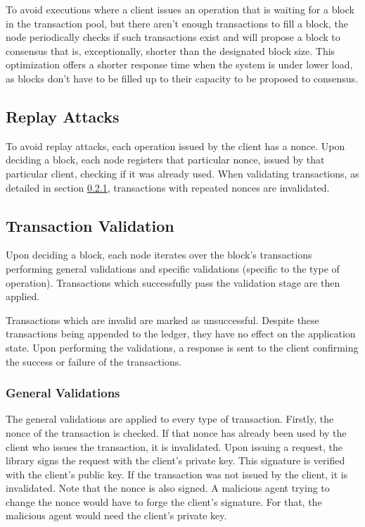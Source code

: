 \documentclass[letterpaper,twocolumn,10pt]{article}
\begin{document}
To avoid executions where a client issues an operation that is waiting for a block in the transaction pool, but there aren't enough transactions to fill a block, the node periodically checks if such transactions exist and will propose a block to consensus that is, exceptionally, shorter than the designated block size. This optimization offers a shorter response time when the system is under lower load, as blocks don't have to be filled up to their capacity to be proposed to consensus.

\subsection{Replay Attacks}

To avoid replay attacks, each operation issued by the client has a nonce. Upon deciding a block, each node registers that particular nonce, issued by that particular client, checking if it was already used. When validating transactions, as detailed in section \ref{validation}, transactions with repeated nonces are invalidated.

\subsection{Transaction Validation}

Upon deciding a block, each node iterates over the block's transactions performing general validations and specific validations (specific to the type of operation). Transactions which successfully pass the validation stage are then applied.

Transactions which are invalid are marked as unsuccessful. Despite these transactions being appended to the ledger, they have no effect on the application state. Upon performing the validations, a response is sent to the client confirming the success or failure of the transactions.

\subsubsection{General Validations}
\label{validation}

The general validations are applied to every type of transaction. Firstly, the nonce of the transaction is checked. If that nonce has already been used by the client who issues the transaction, it is invalidated. Upon issuing a request, the library signs the request with the client's private key. This signature is verified with the client's public key. If the transaction was not issued by the client, it is invalidated. Note that the nonce is also signed. A malicious agent trying to change the nonce would have to forge the client's signature. For that, the malicious agent would need the client's private key.
\end{document}

